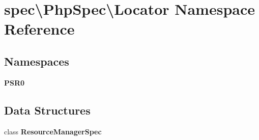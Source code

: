 \section{spec\textbackslash{}Php\+Spec\textbackslash{}Locator Namespace Reference}
\label{namespacespec_1_1_php_spec_1_1_locator}
\subsection*{Namespaces}
\begin{DoxyCompactItemize}
\item 
 {\bf P\+S\+R0}
\end{DoxyCompactItemize}
\subsection*{Data Structures}
\begin{DoxyCompactItemize}
\item 
class {\bf Resource\+Manager\+Spec}
\end{DoxyCompactItemize}
